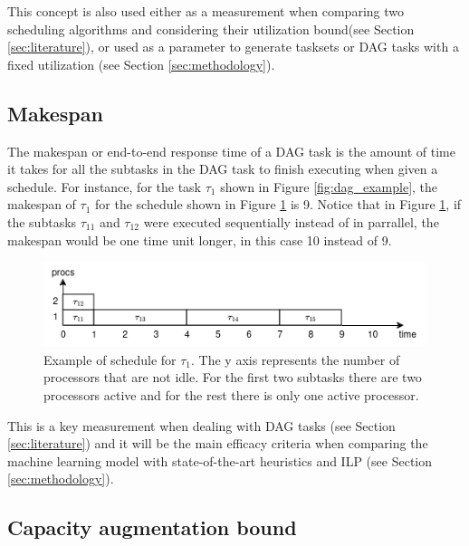 This concept is also used either as a measurement
when comparing two scheduling algorithms 
and considering their utilization bound(see Section \ref{sec:literature}),
or used as a parameter to generate tasksets or DAG tasks with 
a fixed utilization (see Section \ref{sec:methodology}).

\subsection{Makespan}

The makespan or end-to-end response time of a 
DAG task is the amount of time it takes for all the subtasks
in the DAG task to finish executing when given a schedule.
For instance, for the task $\tau_1$ shown in Figure \ref{fig:dag_example},
the makespan of $\tau_1$ for the schedule shown in Figure \ref{fig:schedule_example}
is 9.
Notice that in Figure \ref{fig:schedule_example},
if the subtasks $\tau_{11}$ and $\tau_{12}$ were executed 
sequentially instead of in parrallel, the makespan would be 
one time unit longer, in this case 10 instead of 9.

\begin{figure}
    \centering
    \includegraphics[width=0.5\linewidth]{images/schedule_example.png}
    \caption{Example of schedule for $\tau_1$. The y axis represents the number
    of processors that are not idle. For the first two subtasks there are two processors
    active and for the rest there is only one active processor.}
    \label{fig:schedule_example}
\end{figure}

This is a key measurement when dealing with DAG tasks (see Section \ref{sec:literature})
and it will be the main efficacy criteria when comparing 
the machine learning model with state-of-the-art heuristics and ILP
(see Section \ref{sec:methodology}).

\subsection{Capacity augmentation bound}


